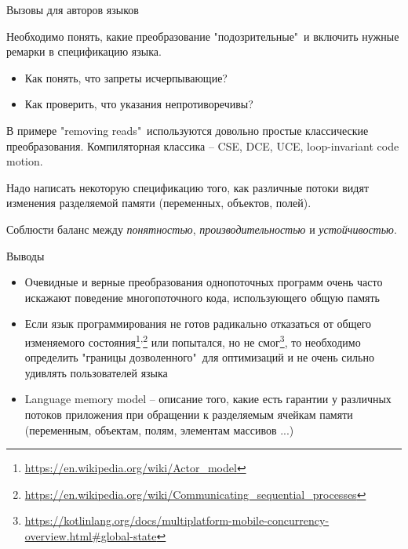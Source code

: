 \begin{frame}{Вызовы для авторов языков}

Необходимо понять, какие преобразование "подозрительные"\ и включить нужные ремарки в спецификацию языка.

\pause
\begin{itemize}
 \item Как понять, что запреты исчерпывающие? 
 \item Как проверить, что указания непротиворечивы?
\end{itemize}

\pause
В примере "removing reads"\ используются довольно простые классические преобразования. Компиляторная классика -- CSE, DCE, UCE, loop-invariant code motion.

\pause
Надо написать некоторую спецификацию того, как различные потоки видят изменения разделяемой памяти (переменных, объектов, полей). 

\pause
Соблюсти баланс между \textit{понятностью}, \textit{производительностью} и \textit{устойчивостью}.

\end{frame}

\begin{frame}{Выводы}

\begin{itemize}
    \item Очевидные и верные преобразования однопоточных программ очень часто искажают поведение многопоточного кода, использующего общую память 
    \item Если язык программирования не готов радикально отказаться от общего изменяемого состояния\footnote{\tiny\url{https://en.wikipedia.org/wiki/Actor_model}}\textsuperscript{,}\footnote{\tiny\url{https://en.wikipedia.org/wiki/Communicating_sequential_processes}} или попытался, но не смог\footnote{\tiny\url{https://kotlinlang.org/docs/multiplatform-mobile-concurrency-overview.html#global-state}}, то необходимо определить "границы дозволенного"\ для оптимизаций и не очень сильно удивлять пользователей языка
    \item Language memory model -- описание того, какие есть гарантии у различных потоков приложения при обращении к разделяемым ячейкам памяти (переменным, объектам, полям, элементам массивов ...)
\end{itemize}

\end{frame}
